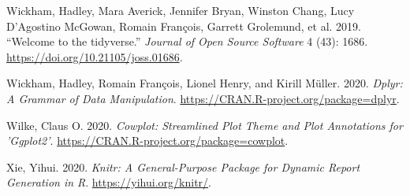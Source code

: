 \documentclass[
]{article}
\begin{document}
\leavevmode\hypertarget{ref-tidyverse}{}%
Wickham, Hadley, Mara Averick, Jennifer Bryan, Winston Chang, Lucy
D'Agostino McGowan, Romain François, Garrett Grolemund, et al. 2019.
``Welcome to the tidyverse.'' \emph{Journal of Open Source Software} 4
(43): 1686. \url{https://doi.org/10.21105/joss.01686}.

\leavevmode\hypertarget{ref-dplyr}{}%
Wickham, Hadley, Romain François, Lionel Henry, and Kirill Müller. 2020.
\emph{Dplyr: A Grammar of Data Manipulation}.
\url{https://CRAN.R-project.org/package=dplyr}.

\leavevmode\hypertarget{ref-cowplot}{}%
Wilke, Claus O. 2020. \emph{Cowplot: Streamlined Plot Theme and Plot
Annotations for 'Ggplot2'}.
\url{https://CRAN.R-project.org/package=cowplot}.

\leavevmode\hypertarget{ref-knitr}{}%
Xie, Yihui. 2020. \emph{Knitr: A General-Purpose Package for Dynamic
Report Generation in R}. \url{https://yihui.org/knitr/}.
\end{document}
